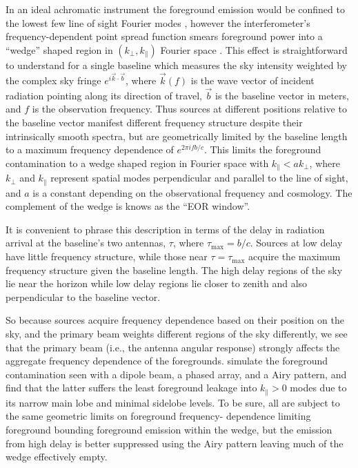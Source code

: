 \documentclass{emulateapj}
\begin{document}
In an ideal achromatic instrument the foreground emission would be confined to the lowest few 
line of sight Fourier modes \citep[e.g.,][]{MoralesBowmanHewittFGsub}, however  the  
interferometer's frequency-dependent point spread function smears foreground power into a ``wedge'' shaped 
region in  $(k_\perp,k_\parallel)$ Fourier space \citep{Dattapowerspec,X13, PoberWedge,MoralesPSShapes, VedanthamWedge, nithya13, CathWedge, AdrianWedge1, AdrianWedge2,parsons12b}. This effect is straightforward to understand for a single baseline which measures the sky intensity weighted by the complex sky fringe 
$e^{i \vec{k}\cdot\vec{b}}$, where $\vec{k}(f)$ is the wave vector of incident radiation pointing along its direction of travel, $\vec{b}$ is the baseline vector in meters, and $f$ is the observation frequency. Thus sources at different positions relative to the baseline vector manifest different 
frequency structure despite their intrinsically smooth spectra, but are geometrically limited 
by the baseline length to a maximum frequency dependence of  $e^{2\pi i f b/c}$. This limits the foreground contamination 
to a wedge shaped region in Fourier space with $k_\parallel<a k_\perp$, where $k_\perp$ and $k_\parallel$ represent spatial modes 
perpendicular and parallel to the line of sight, and $a$ is a constant depending on the observational frequency and cosmology. The complement of the wedge is knows as the ``EOR window''.

It is convenient to phrase this description in terms 
of the delay in radiation arrival at the baseline's two antennas, $\tau$, where $\tau_
\text{max}=b/c$. Sources at low delay have little frequency 
structure, while those near $\tau=\tau_\text{max}$ acquire the maximum frequency 
structure given the baseline length. The high delay regions of the sky lie near the horizon while low delay 
regions lie closer to zenith and also perpendicular to the baseline vector.

So because sources acquire frequency dependence based on their position on the sky, and the primary beam weights different regions of the sky differently, we see that the primary beam (i.e., the antenna angular response) strongly affects the aggregate frequency dependence 
of the foregrounds. \citet{nithya15} simulate the foreground contamination seen with a dipole beam, a phased array, and a Airy pattern,
and find that the latter suffers the least foreground leakage into
 $k_\parallel>0$ modes due to its narrow main lobe and minimal sidelobe 
levels. To be sure, all are subject to the same geometric limits on foreground frequency-
dependence limiting foreground bounding foreground emission within the wedge, but the emission from high delay is better suppressed using the 
Airy pattern leaving much of the wedge effectively empty. 
\end{document}
